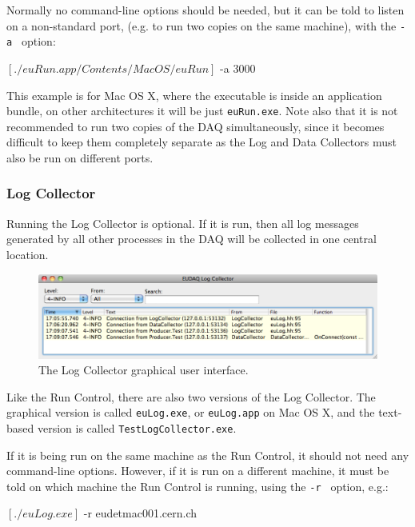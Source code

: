 Normally no command-line options should be needed, but it can be told to listen on a non-standard port,
(e.g. to run two copies on the same machine), with the \texttt{-a } option:
\begin{listing}[mybash]
$[./euRun.app/Contents/MacOS/euRun]$ -a 3000
\end{listing}

This example is for Mac OS X, where the executable is inside an application bundle,
on other architectures it will be just \texttt{euRun.exe}.
Note also that it is not recommended to run two copies of the DAQ simultaneously,
since it becomes difficult to keep them completely separate as the Log and Data Collectors
must also be run on different ports.

\subsubsection{Log Collector}
Running the Log Collector is optional. If it is run, then all log messages generated by all other processes
in the DAQ will be collected in one central location.

\begin{figure}[htb]
  \begin{center}
    \includegraphics[width=\textwidth]{src/images/LogCollector}
    \caption{The Log Collector graphical user interface.}
    \label{fig:LogCollector}
  \end{center}
\end{figure}

Like the Run Control, there are also two versions of the Log Collector.
The graphical version is called \texttt{euLog.exe}, or \texttt{euLog.app} on Mac OS X,
and the text-based version is called \texttt{TestLogCollector.exe}.

If it is being run on the same machine as the Run Control, it should not need any command-line options.
However, if it is run on a different machine, it must be told on which machine the Run Control is running,
using the \texttt{-r } option, e.g.:
\begin{listing}[mybash]
$[./euLog.exe]$ -r eudetmac001.cern.ch
\end{listing}

